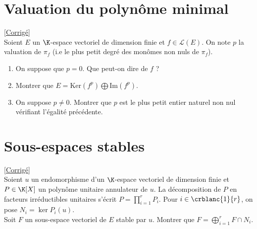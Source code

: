 \documentclass[8pt]{book}
\begin{document}
	\section{Valuation du polynôme minimal }
	\label{Valuation du polynôme minimal}
	\textcolor{blue}{\hyperref[Valuation du polynôme minimal corrigé]{[Corrigé]}}\\
	Soient $E$ un $\K$-espace vectoriel de dimension finie et $f\in \mathcal{L}(E)$. On note $p$ la valuation de $\pi_f$ (i.e le plus petit degré des monômes non nuls de $\pi_f$). 
	\begin{enumerate}
		\item On suppose que $p=0$. Que peut-on dire de $f$ ?
		\item Montrer que $E=\text{Ker}(f^p)\bigoplus\text{Im}(f^p)$.
		\item On suppose $p\ne 0$. Montrer que $p$ est le plus petit entier naturel non nul vérifiant l'égalité précédente.
	\end{enumerate}
	
	\section{Sous-espaces stables }
	\label{Sous-espaces stables}
	\textcolor{blue}{\hyperref[Sous-espaces stables corrigé]{[Corrigé]}}\\
	Soient $u$ un endomorphisme d’un $\K$-espace vectoriel de dimension finie et $P\in \K[X]$ un polynôme unitaire annulateur de $u$. La décomposition de $P$ en facteurs irréductibles unitaires s’écrit $P=\displaystyle\prod\limits_{i=1}^r{P_i}$. Pour $i\in \crblanc{1}{r}$, on pose $N_i=\ker P_i(u)$.\\
	Soit $F$ un sous-espace vectoriel de $E$ stable par $u$. Montrer que $F=\displaystyle\bigoplus\limits_{i=1}^r{F\cap N_i}$.
	
\end{document}
